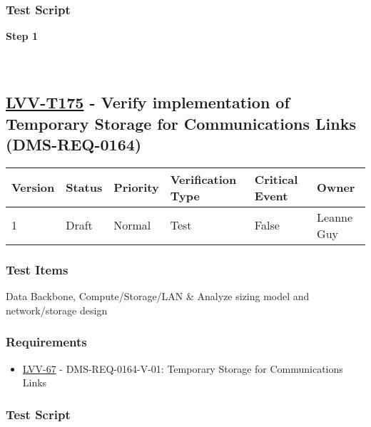 \hypertarget{test-script-74}{%
\subsubsection{Test Script}\label{test-script-74}}

\textbf{Step 1}\\
~\\
~\\

\hypertarget{lvv-t175---verify-implementation-of-temporary-storage-for-communications-links-dms-req-0164}{%
\subsection{\texorpdfstring{\href{https://jira.lsstcorp.org/secure/Tests.jspa\#/testCase/LVV-T175}{LVV-T175}
- Verify implementation of Temporary Storage for Communications Links
(DMS-REQ-0164)}{LVV-T175 - Verify implementation of Temporary Storage for Communications Links (DMS-REQ-0164)}}\label{lvv-t175---verify-implementation-of-temporary-storage-for-communications-links-dms-req-0164}}

\begin{longtable}[]{@{}llllll@{}}
\toprule
Version & Status & Priority & Verification Type & Critical Event &
Owner\tabularnewline
\midrule
\endhead
1 & Draft & Normal & Test & False & Leanne Guy\tabularnewline
\bottomrule
\end{longtable}

\hypertarget{test-items-75}{%
\subsubsection{Test Items}\label{test-items-75}}

Data Backbone, Compute/Storage/LAN \& Analyze sizing model and
network/storage design

\hypertarget{requirements-75}{%
\subsubsection{Requirements}\label{requirements-75}}

\begin{itemize}
\tightlist
\item
  \href{https://jira.lsstcorp.org/browse/LVV-67}{LVV-67} -
  DMS-REQ-0164-V-01: Temporary Storage for Communications Links
\end{itemize}

\hypertarget{test-script-75}{%
\subsubsection{Test Script}\label{test-script-75}}

